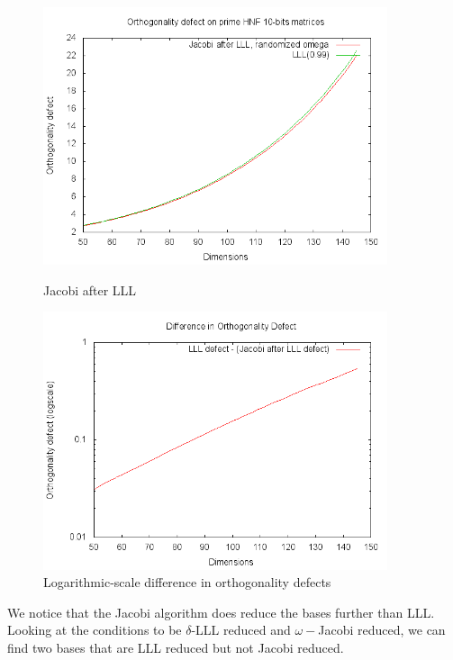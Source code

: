 \documentclass[10pt, a4paper]{article}
\begin{document}
\begin{figure}[H]
\begin{minipage}{.45\textwidth}
  \centering
    \includegraphics[width=0.9\textwidth]{results-graphs/LLLThenJacobi/defect.png}
      \caption{Jacobi after LLL}
  \label{fig4}
\end{minipage}
\hspace{.05\textwidth}
\begin{minipage}{.45\textwidth}

  \centering
    \includegraphics[width=0.9\textwidth]{results-graphs/LLLThenJacobi/defect-logscale-difference.png}
    
  \caption{Logarithmic-scale difference in orthogonality defects}
  \label{fig5}
\end{minipage}
\end{figure}

We notice that the Jacobi algorithm does reduce the bases further than LLL. Looking at the conditions to be $\delta$-LLL reduced and $\omega-$Jacobi reduced, we can find two bases that are LLL reduced but not Jacobi reduced.
\end{document}
